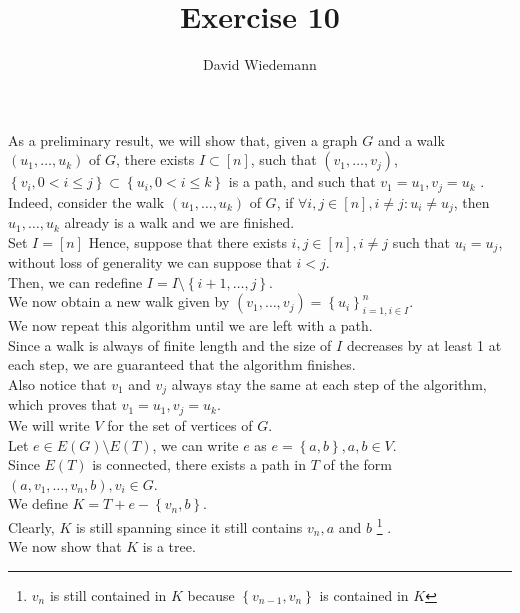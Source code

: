 \documentclass[11pt, a4paper]{article}
\begin{document}
\title{Exercise 10}
\author{David Wiedemann}
\maketitle
As a preliminary result, we will show that, given a graph $G$ and a walk $( u_1, \ldots, u_k) $ of $G$, there exists $I \subset [ n] $, such that $ ( v_1, \ldots, v_j)  $, $ \left\{ v_i, 0< i \leq j \right\} \subset \left\{ u_i, 0 <i \leq k \right\} $ is a path, and such that $v_1= u_1, v_j = u_k$ .\\
Indeed, consider the walk $( u_1, \ldots, u_k) $ of $G$, if $\forall i,j \in [ n] , i\neq j: u_i \neq u_j$, then $u_1, \ldots, u_k$ already is a walk and we are finished.\\
Set $I= [ n] $
Hence, suppose that there exists $i,j \in [ n] , i\neq j$ such that $u_i = u_j$, without loss of generality we can suppose that $i<j$.\\
Then, we can redefine  $I = I\setminus \left\{ i+1, \ldots, j \right\} $.\\
We now obtain a new walk given by $ ( v_1, \ldots, v_j) = \left\{ u_i \right\}_{i=1, i \in I} ^{n}$.\\
We now repeat this algorithm until we are left with a path.\\
Since a walk is always of finite length and the size of $I$ decreases by at least 1 at each step, we are guaranteed that the algorithm finishes.\\
Also notice that $v_1$ and $v_j$ always stay the same at each step of the algorithm, which proves that $v_1= u_1, v_j = u_k$.\\
\hr
We will write $V $ for the set of vertices of  $G$.\\
Let $e \in E( G) \setminus E( T) $, we can write $e$ as $e= \left\{ a,b \right\} , a,b \in V$.\\
Since $E( T)$ is connected, there exists a path in $T$ of the form $(a, v_1, \ldots, v_n,b), v_i \in G $.\\
We define $ K = T + e - \left\{ v_n,b \right\} $.\\
Clearly, $K$ is still spanning since it still contains $v_n, a $ and $b$ \footnote { $v_n$ is still contained in $K$ because $ \left\{ v_{n-1} , v_n \right\} $ is contained in $K$} .\\
We now show that $K$ is a tree.\\
\end{document}
